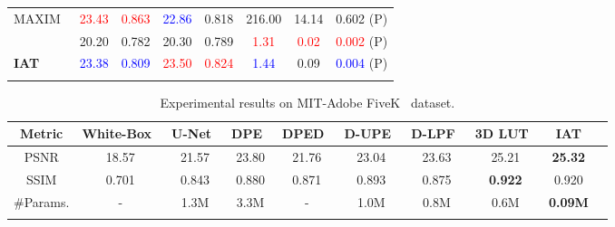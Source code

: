 \documentclass{bmvc2k}
\newcommand{\red}[1]{\textcolor{red}{#1}}
\newcommand{\blue}[1]{\textcolor{blue}{#1}}
\begin{document}
\begin{table}[t]
\begin{adjustbox}{max width = 0.95\linewidth}
\begin{tabular}{l|cc|cc|ccc}
MAXIM~\cite{MLP_enhancement}        & \red{23.43}     & \red{0.863} & \blue{22.86}     & 0.818       & 216.00  & 14.14    & 0.602 (P) \\ \Xhline{0.6pt}
\multicolumn{1}{l|}{\textbf{IAT (local)}} & 20.20        & 0.782        & 20.30        & 0.789        & \red{1.31}      & \red{0.02}           & \red{0.002} (P)        \\
\textbf{IAT }      &  \blue{23.38}  &   \blue{0.809}   & \red{23.50}       & \red{0.824}        & \blue{1.44}      & 0.09           & \blue{0.004} (P)         \\ \Xhline{1.0pt}
\end{tabular}
\end{adjustbox}
\end{table}

\begin{table}[t]
\caption{Experimental results on MIT-Adobe FiveK~\cite{fivek_dataset} dataset.}
\centering
\setlength\tabcolsep{2pt}
\begin{adjustbox}{max width = 0.98\linewidth}
\begin{tabular}{c|ccccccccc}
\Xhline{1.0pt}
Metric     & White-Box~\cite{white_box}  & U-Net~\cite{unet}  & DPE~\cite{DPE_CVPR18}   & DPED~\cite{DPED}  & D-UPE~\cite{DeepUPE_2019_CVPR} & D-LPF~\cite{Deep_LPF} & 3D LUT~\cite{3DLUT}  & \textbf{IAT}   \\ \hline
PSNR       & 18.57   & 21.57 & 23.80 & 21.76 & 23.04    & 23.63    & 25.21 & \textbf{25.32} \\ \hline
SSIM       & 0.701    & 0.843 & 0.880 & 0.871 & 0.893    & 0.875    & \textbf{0.922} & 0.920 \\ \hline
\#Params. & -     & 1.3M  & 3.3M  & -     & 1.0M     & 0.8M     & 0.6M & \textbf{0.09M} \\
\Xhline{1.0pt}
\end{tabular}
\end{adjustbox}
\label{tab:MIT5k}
\vspace{-3mm}
\end{table}
\end{document}
